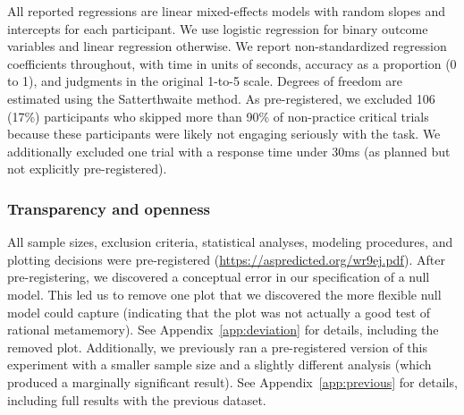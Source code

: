 All reported regressions are linear mixed-effects models with random slopes and intercepts for each participant. We use logistic regression for binary outcome variables and linear regression otherwise. We report non-standardized regression coefficients throughout, with time in units of seconds, accuracy as a proportion (0 to 1), and judgments in the original 1-to-5 scale. Degrees of freedom are estimated using the Satterthwaite method. As pre-registered, we excluded 106 (17\%) participants who skipped more than 90\% of non-practice critical trials because these participants were likely not engaging seriously with the task. We additionally excluded one trial with a response time under 30ms (as planned but not explicitly pre-registered).

\subsubsection{Transparency and openness}
All sample sizes, exclusion criteria, statistical analyses, modeling procedures, and plotting decisions were pre-registered (\url{https://aspredicted.org/wr9ej.pdf}). After pre-registering, we discovered a conceptual error in our specification of a null model. This led us to remove one plot that we discovered the more flexible null model could capture (indicating that the plot was not actually a good test of rational metamemory). See Appendix~\ref{app:deviation} for details, including the removed plot. Additionally, we previously ran a pre-registered version of this experiment with a smaller sample size and a slightly different analysis (which produced a marginally significant result). See Appendix~\ref{app:previous} for details, including full results with the previous dataset.

